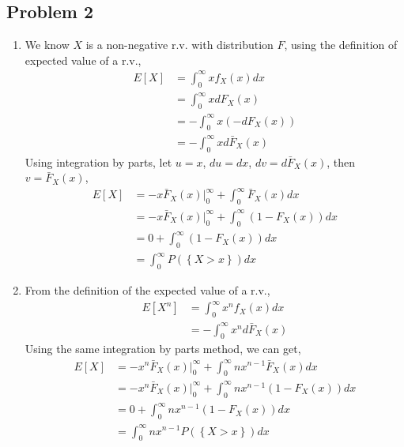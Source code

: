 \documentclass{article}
\begin{document}
	\subsection*{Problem 2}
		\begin{enumerate}
			\item We know $X$ is a non-negative r.v. with distribution $F$, using the
				definition of expected value of a r.v.,
				\begin{align*}
					E[X] &= \int_{0}^{\infty} xf_{X}(x)dx \\
					&= \int_{0}^{\infty} xdF_{X}(x) \\
					&= -\int_{0}^{\infty} x (- d{F}_X(x)) \\
					&= -\int_{0}^{\infty} xd\bar{F}_X(x)
				\end{align*}
				Using integration by parts,
				let $u = x$, $du = dx$, $dv = d\bar{F}_{X}(x)$, then $v = \bar{F}_{X}(x)$,
				\begin{align*}
					E[X] &= -x\bar{F}_{X}(x) \bigg|_{0}^{\infty} + \int_{0}^{\infty}\bar{F}_{X}(x)dx \\
					&= -x\bar{F}_{X}(x) \bigg|_{0}^{\infty} + \int_{0}^{\infty}(1 - F_{X}(x))dx \\
					&= 0 + \int_{0}^{\infty}(1 - F_{X}(x))dx \\
					&= \int_{0}^{\infty}P(\left\{ X > x \right\})dx
				\end{align*}
			\item From the definition of the expected value of a r.v.,
				\begin{align*}
					E[X^n] &= \int_{0}^{\infty} x^nf_{X}(x)dx \\
					&= -\int_{0}^{\infty} x^nd\bar{F}_X(x)
				\end{align*}
				Using the same integration by parts method, we can get,
				\begin{align*}
					E[X] &= -x^n\bar{F}_{X}(x) \bigg|_{0}^{\infty} + \int_{0}^{\infty}nx^{n-1}\bar{F}_{X}(x)dx \\
					&= -x^n\bar{F}_{X}(x) \bigg|_{0}^{\infty} + \int_{0}^{\infty}nx^{n-1}(1 - F_{X}(x))dx \\
					&= 0 + \int_{0}^{\infty}nx^{n-1}(1 - F_{X}(x))dx \\
					&= \int_{0}^{\infty}nx^{n-1}P(\left\{ X > x \right\})dx
				\end{align*}
		\end{enumerate}
\end{document}
